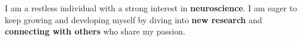 I am a restless individual with a strong interest in \textbf{neuroscience}. I am eager to 
keep growing and developing myself by diving into \textbf{new research} and \textbf{connecting with others} 
who share my passion.